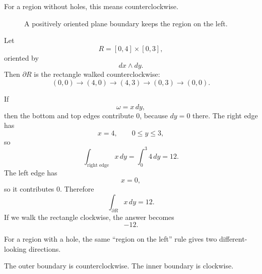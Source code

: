 For a region without holes, this means counterclockwise.

\begin{figure}[h]
\centering
{}
\caption{A positively oriented plane boundary keeps the region on the left.}
\end{figure}

\begin{example}
Let
\[
    R=[0,4]\times[0,3],
\]
oriented by
\[
    dx\wedge dy.
\]
Then \(\partial R\) is the rectangle walked counterclockwise:
\[
    (0,0)\to(4,0)\to(4,3)\to(0,3)\to(0,0).
\]

If
\[
    \omega=x\,dy,
\]
then the bottom and top edges contribute \(0\), because \(dy=0\) there.  The right edge
has
\[
    x=4,\qquad 0\le y\le3,
\]
so
\[
    \int_{\text{right edge}}x\,dy=\int_0^3 4\,dy=12.
\]
The left edge has
\[
    x=0,
\]
so it contributes \(0\).  Therefore
\[
\boxed{
    \int_{\partial R} x\,dy=12.
}
\]
If we walk the rectangle clockwise, the answer becomes
\[
    -12.
\]
\end{example}

For a region with a hole, the same ``region on the left'' rule gives two different-looking
directions.

The outer boundary is counterclockwise.  The inner boundary is clockwise.

